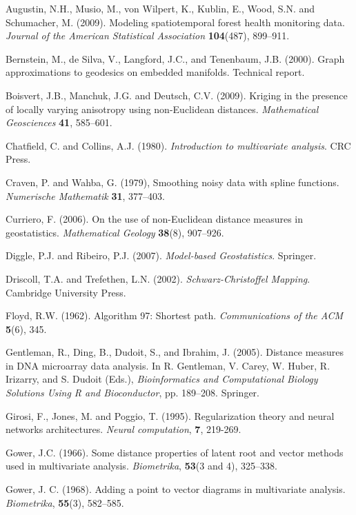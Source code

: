 \documentclass[useAMS, referee]{biom}
\begin{document}
\begin{thebibliography}{99}

\bibitem{} Augustin, N.H., Musio, M., von Wilpert, K., Kublin, E., Wood, S.N. and Schumacher, M. (2009). 
Modeling spatiotemporal forest health monitoring data. \textit{Journal of the American Statistical Association} \textbf{104}(487), 899--911.

\bibitem{} Bernstein, M., de Silva, V., Langford, J.C., and Tenenbaum, J.B. (2000). Graph approximations to geodesics on embedded manifolds. Technical report.

\bibitem{} Boisvert, J.B., Manchuk,  J.G. and Deutsch, C.V. (2009). Kriging in the presence of locally varying anisotropy using non-{E}uclidean distances. \textit{Mathematical Geosciences} \textbf{41}, 585--601.

\bibitem{} Chatfield, C. and Collins, A.J. (1980). \textit{Introduction to multivariate analysis}. CRC Press.

\bibitem{} Craven, P. and Wahba, G. (1979), Smoothing noisy data with spline functions. \textit{Numerische Mathematik} \textbf{31}, 377--403.

\bibitem{} Curriero, F. (2006). On the use of non-{E}uclidean distance measures in geostatistics. \textit{Mathematical Geology} \textbf{38}(8), 907--926.

\bibitem{} Diggle, P.J. and Ribeiro, P.J. (2007). \textit{Model-based Geostatistics}. Springer.

\bibitem{} 	Driscoll, T.A. and Trefethen, L.N. (2002). \textit{Schwarz-Christoffel Mapping}. Cambridge University Press.

\bibitem{} Floyd, R.W. (1962). Algorithm 97: Shortest path. \textit{Communications of the ACM} \textbf{5}(6), 345.

\bibitem{} Gentleman, R., Ding, B., Dudoit, S., and Ibrahim, J. (2005). Distance measures in DNA microarray data analysis. In R. Gentleman, V. Carey, W. Huber, R. Irizarry, and S. Dudoit (Eds.), \textit{Bioinformatics and Computational Biology Solutions Using R and Bioconductor}, pp. 189--208. Springer.

\bibitem{} Girosi, F., Jones, M. and Poggio, T. (1995). Regularization theory and neural networks architectures. \textit{Neural computation}, \textbf{7}, 219-269.

\bibitem{} Gower, J.C. (1966). Some distance properties of latent root and vector methods used in multivariate analysis. \textit{Biometrika}, \textbf{53}(3 and 4), 325--338.

\bibitem{} Gower, J. C. (1968). Adding a point to vector diagrams in multivariate analysis. \textit{Biometrika}, \textbf{55}(3), 582--585.


\end{thebibliography}
\end{document}

